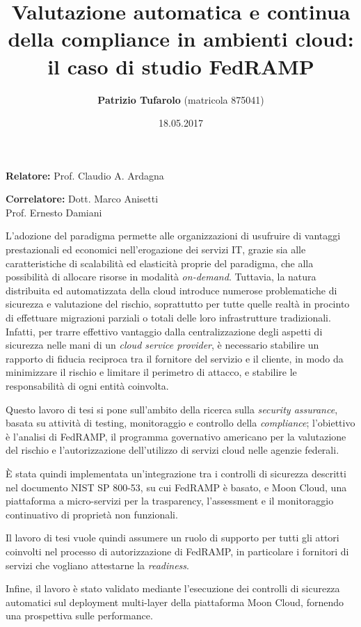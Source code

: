 \documentclass[10pt,a4paper]{article}
\title{Valutazione automatica e continua della compliance in ambienti cloud: il caso di studio FedRAMP}
\author{\textbf{Patrizio Tufarolo} (matricola 875041)}
\date{18.05.2017}
\begin{document}
\maketitle
\begin{multicols}{2}
\textbf{Relatore:} Prof. Claudio A. Ardagna
\begin{flushright}
\textbf{Correlatore:} Dott. Marco Anisetti\\[.1cm]
Prof. Ernesto Damiani
\end{flushright}
\end{multicols}
\justify

L'adozione del paradigma permette alle organizzazioni di usufruire di vantaggi prestazionali ed economici nell'erogazione dei servizi IT, grazie sia alle caratteristiche di scalabilità ed elasticità proprie del paradigma, che alla possibilità di allocare risorse in modalità \textit{on-demand}.
Tuttavia, la natura distribuita ed automatizzata della cloud introduce numerose problematiche di sicurezza e valutazione del rischio, soprattutto per tutte quelle realtà in procinto di effettuare migrazioni parziali o totali delle loro infrastrutture tradizionali.
Infatti, per trarre effettivo vantaggio dalla centralizzazione degli aspetti di sicurezza nelle mani di un \textit{cloud service provider}, è necessario stabilire un rapporto di fiducia reciproca tra il fornitore del servizio e il cliente, in modo da minimizzare il rischio e limitare il perimetro di attacco, e stabilire le responsabilità di ogni entità coinvolta.

Questo lavoro di tesi si pone sull'ambito della ricerca sulla \textit{security assurance}, basata su attività di testing, monitoraggio e controllo della \textit{compliance}; l'obiettivo è l'analisi di FedRAMP, il programma governativo americano per la valutazione del rischio e l'autorizzazione dell'utilizzo di servizi cloud nelle agenzie federali.

È stata quindi implementata un'integrazione tra i controlli di sicurezza descritti nel documento NIST SP 800-53, su cui FedRAMP è basato, e Moon Cloud, una piattaforma a micro-servizi per la trasparency, l'assessment e il monitoraggio continuativo di proprietà non funzionali.

Il lavoro di tesi vuole quindi assumere un ruolo di supporto per tutti gli attori coinvolti nel processo di autorizzazione di FedRAMP, in particolare i fornitori di servizi che vogliano attestarne la \textit{readiness}.

Infine, il lavoro è stato validato mediante l'esecuzione dei controlli di sicurezza automatici sul deployment multi-layer della piattaforma Moon Cloud, fornendo una prospettiva sulle performance.
\end{document}
